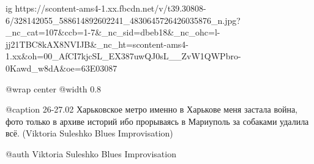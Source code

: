  
 
 
 
 


\begin{center}
\begin{minipage}{\textwidth}

\ifcmt
  ig https://scontent-ams4-1.xx.fbcdn.net/v/t39.30808-6/328142055_588614892602241_4830645726426035876_n.jpg?_nc_cat=107&ccb=1-7&_nc_sid=dbeb18&_nc_ohc=l-jj21TBC8kAX8NVIJB&_nc_ht=scontent-ams4-1.xx&oh=00_AfCI7kjcSL_EX387uwQJ0sL__ZvW1QWPbro-0Kawd_w8dA&oe=63E03087

  @wrap center
  @width 0.8

  @caption 26-27.02 Харьковское метро именно в Харькове меня застала война, фото только в архиве историй ибо прорываясь в Мариуполь за собаками удалила всё. (Viktoria Suleshko Blues Improvisation)

  @auth Viktoria Suleshko Blues Improvisation

\fi
\end{minipage}
\end{center}

